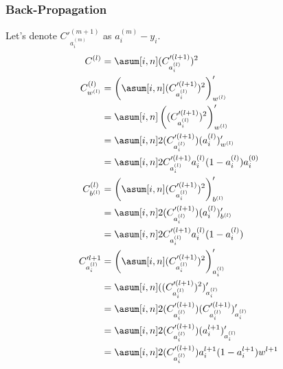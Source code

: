 \documentclass{article}
\begin{document}
\subsubsection{Back-Propagation}
Let's denote $C'^{(m+1)}_{a_i^{(m)}}$ as $a_i^{(m)} - y_i$.
\begin{align}
    C^{(l)}              & = \asum[i, n] (C'^{(l+1)}_{a_i^{(l)}})^2                                     \\
    C^{(l)}_{w^{(l)}}    & = \left(\asum[i, n] (C'^{(l+1)}_{a_i^{(l)}})^2\right)'_{w^{(l)}}             \\
                         & = \asum[i, n] \left((C'^{(l+1)}_{a_i^{(l)}})^2\right)'_{w^{(l)}}             \\
                         & = \asum[i, n] 2(C'^{(l+1)}_{a_i^{(l)}})(a^{(l)}_i)'_{w^{(l)}}                \\
                         & = \asum[i, n] 2C'^{(l+1)}_{a_i^{(l)}}a^{(l)}_i(1 - a^{(l)}_i)a_i^{(0)}       \\
    C^{(l)}_{b^{(l)}}    & = \left(\asum[i, n] (C'^{(l+1)}_{a_i^{(l)}})^2\right)'_{b^{(l)}}             \\
                         & = \asum[i, n] 2(C'^{(l+1)}_{a_i^{(l)}})(a^{(l)}_i)'_{b^{(l)}}                \\
                         & = \asum[i, n] 2C'^{(l+1)}_{a_i^{(l)}}a^{(l)}_i(1 - a^{(l)}_i)                \\
    C'^{l+1}_{a_i^{(l)}} & = \left(\asum[i, n] (C'^{(l+1)}_{a_i^{(l)}})^2\right)'_{a_i^{(l)}}           \\
                         & = \asum[i, n] ((C'^{(l+1)}_{a_i^{(l)}})^2)'_{a_i^{(l)}}                      \\
                         & = \asum[i, n] 2(C'^{(l+1)}_{a_i^{(l)}})(C'^{(l+1)}_{a_i^{(l)}})'_{a_i^{(l)}} \\
                         & = \asum[i, n] 2(C'^{(l+1)}_{a_i^{(l)}})(a_i^{l+1})'_{a_i^{(l)}}              \\
                         & = \asum[i, n] 2(C'^{(l+1)}_{a_i^{(l)}})a_i^{l+1} (1 - a_i^{l+1})w^{l+1}      \\
\end{align}
\end{document}
